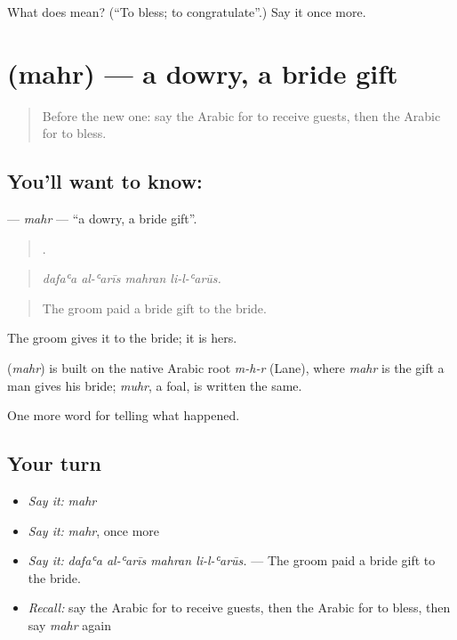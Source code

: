 \begin{tcolorbox}[breakable,colback=teal!4,colframe=teal!35!black,title={Before you move on}]
What does  mean? (\textquotedblleft{}To bless; to congratulate\textquotedblright{}.) Say it once more.
\end{tcolorbox}
\section[\texorpdfstring{\ar{مهر} (mahr)}{مهر (mahr)}]{ (mahr) — a dowry, a bride gift}

\label{lesson:AR-C336-mahr}



\begin{quote}
Before the new one: say the Arabic for to receive guests, then the Arabic for to bless.
\end{quote}

\subsection*{You'll want to know: }
\textbf{} — \emph{mahr} — \textquotedblleft{}a dowry, a bride gift\textquotedblright{}.

\begin{quote}
   .
\end{quote}

\begin{quote}
\emph{dafaʿa al-ʿarīs mahran li-l-ʿarūs.}
\end{quote}

\begin{quote}
The groom paid a bride gift to the bride.
\end{quote}

The groom gives it to the bride; it is hers.

\begin{cousinweb}
\textbf{} (\emph{mahr}) is built on the native Arabic root \emph{m-h-r} (Lane), where \emph{mahr} is the gift a man gives his bride; \emph{muhr}, a foal, is written the same.
\end{cousinweb}

\begin{grammarlens}[title={What you've built}]
One more word for telling what happened.
\end{grammarlens}

\subsection*{Your turn}
\begin{itemize}
\raggedright
  \item \emph{Say it:} \emph{mahr}
  \item \emph{Say it:} \emph{mahr}, once more
  \item \emph{Say it:} \emph{dafaʿa al-ʿarīs mahran li-l-ʿarūs.} — The groom paid a bride gift to the bride.
  \item \emph{Recall:} say the Arabic for to receive guests, then the Arabic for to bless, then say \emph{mahr} again
\end{itemize}

